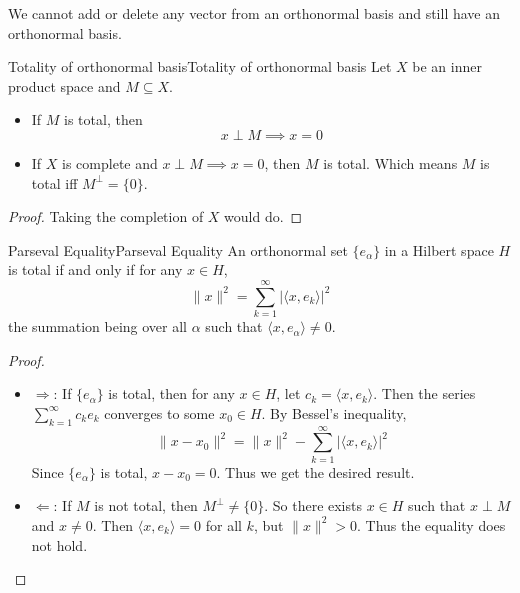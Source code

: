 \documentclass[../main.tex]{subfiles}
\begin{document}
We cannot add or delete any vector from an orthonormal basis and still have an orthonormal basis.

\begin{theorem}{Totality of orthonormal basis}{Totality of orthonormal basis}
	Let $X$ be an inner product space and $M \subseteq X$.
	\begin{itemize}
		\item If $M$ is total, then
			\begin{equation*}
				x\perp M \implies x=0
			\end{equation*}
		\item If $X$ is complete and $x\perp M \implies x=0$, then $M$ is total. Which means $M$ is total iff $M^\perp = \{0\}$.
	\end{itemize}
\end{theorem}
\begin{proof}
Taking the completion of $X$ would do.
\end{proof}

\begin{theorem}{Parseval Equality}{Parseval Equality}
	An orthonormal set $\{e_{\alpha}\}$ in a Hilbert space $H$ is total if and only if for any $x\in H$,
	\begin{equation}
		\|x\|^2 = \sum_{k=1}^\infty |\langle x, e_k \rangle|^2
	\end{equation}
	the summation being over all $\alpha$ such that $\langle x, e_{\alpha} \rangle \neq 0$.
\end{theorem}
\begin{proof}
\begin{itemize}
	\item $\Rightarrow$: If $\{e_{\alpha}\}$ is total, then for any $x\in H$, let $c_k = \langle x, e_k \rangle$. Then the series $\sum_{k=1}^\infty c_k e_k$ converges to some $x_0 \in H$. By Bessel's inequality,
		\begin{equation*}
			\|x - x_0\|^2 = \|x\|^2 - \sum_{k=1}^\infty |\langle x, e_k \rangle|^2
		\end{equation*}
		Since $\{e_{\alpha}\}$ is total, $x - x_0 = 0$. Thus we get the desired result.
	\item $\Leftarrow$: If $M$ is not total, then $M^\perp \neq \{0\}$. So there exists $x\in H$ such that $x\perp M$ and $x\neq 0$. Then $\langle x, e_k \rangle = 0$ for all $k$, but $\|x\|^2 > 0$. Thus the equality does not hold.
\end{itemize}
\end{proof}
\end{document}
